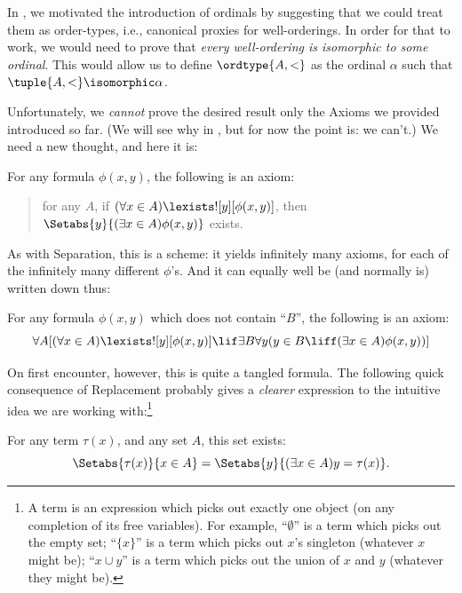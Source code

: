 \documentclass[../../../include/open-logic-section]{subfiles}
\begin{document}

In , we motivated the introduction of ordinals by
suggesting that we could treat them as order-types, i.e., canonical
proxies for well-orderings. In order for that to work, we would need
to prove that \emph{every well-ordering is isomorphic to some
ordinal}. This would allow us to define $\ordtype{A, <}$ as the
ordinal $\alpha$ such that $\tuple{A, <} \isomorphic \alpha$. 

Unfortunately, we \emph{cannot} prove the desired result only the
Axioms we provided introduced so far. (We will see why in
, but for now the point is: we can't.) We need a
new thought, and here it is:

\begin{axiom}
For any formula $\phi(x, y)$, the following is an axiom:
\begin{quote}
	for any $A$, if $(\forall x \in A)\lexists![y][\phi(x,y)]$, then
	$\Setabs{y}{(\exists x \in A)\phi(x,y)}$ exists.
\end{quote}
\end{axiom}
\noindent
As with Separation, this is a scheme: it yields infinitely many
axioms, for each of the infinitely many different $\phi$'s. And it can
equally well be (and normally is) written down thus:

\begin{defish}
For any formula $\phi(x,y)$ which does not contain ``$B$'', the following is an axiom:
\[
\forall A[(\forall x \in A)\lexists![y][\phi(x,y)] \lif \exists B\forall y (y \in B \liff (\exists x \in A)\phi(x,y))]
\]
\end{defish}

On first encounter, however, this is quite a tangled formula. The
following quick consequence of Replacement probably gives a
\emph{clearer} expression to the intuitive idea we are working with:\footnote{A term is an expression which picks out exactly one object (on any completion of its free variables). For example, ``$\emptyset$'' is a term which picks out the empty set; ``$\{x\}$'' is a term which picks out $x$'s singleton (whatever $x$ might be); ``$x \cup y$'' is a term which picks out the union of $x$ and $y$ (whatever they might be).}

\begin{cor}
For any term $\tau(x)$, and any set $A$, this set exists:
\[
	\Setabs{\tau(x)}{x \in A} = \Setabs{y}{(\exists x \in A)y = \tau(x)}.
\]
\end{cor}
\end{document}
